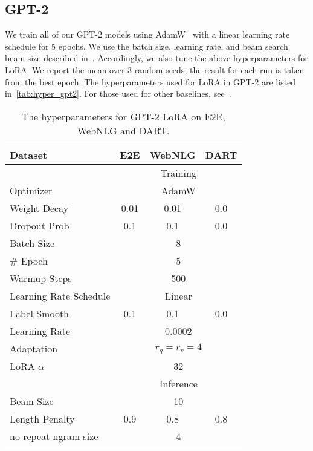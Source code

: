 \subsection{GPT-2}
\label{app:hps_gpt2}
We train all of our GPT-2 models using AdamW~\citep{loshchilov2017decoupled} with a linear learning rate schedule for 5 epochs.
We use the batch size, learning rate, and beam search beam size described in~\cite{li_prefix-tuning_2021}.
Accordingly, we also tune the above hyperparameters for LoRA.
We report the mean over 3 random seeds; the result for each run is taken from the best epoch.
The hyperparameters used for LoRA in GPT-2 are listed in~\autoref{tab:hyper_gpt2}.
For those used for other baselines, see~\cite{li_prefix-tuning_2021}.
\begin{table}[h]
\centering
\begin{tabular}{l|ccc}
\hline
\toprule
Dataset & E2E & WebNLG & DART \\
\midrule
&\multicolumn{3}{c}{Training} \\
\midrule
Optimizer & \multicolumn{3}{c}{AdamW} \\
Weight Decay & 0.01 & 0.01 & 0.0\\
Dropout Prob & 0.1 & 0.1 & 0.0\\
Batch Size & \multicolumn{3}{c}{8} \\
\# Epoch & \multicolumn{3}{c}{5} \\
Warmup Steps & \multicolumn{3}{c}{500} \\
Learning Rate Schedule & \multicolumn{3}{c}{Linear} \\
Label Smooth & 0.1 & 0.1 & 0.0 \\
Learning Rate & \multicolumn{3}{c}{0.0002} \\
Adaptation & \multicolumn{3}{c}{$r_q=r_v=4$} \\
LoRA $\alpha$ & \multicolumn{3}{c}{32} \\
\midrule
&\multicolumn{3}{c}{Inference} \\
\midrule
Beam Size & \multicolumn{3}{c}{10} \\
Length Penalty & 0.9 & 0.8 & 0.8 \\
no repeat ngram size & \multicolumn{3}{c}{4} \\
\bottomrule
\end{tabular}
\caption{The hyperparameters for GPT-2 LoRA on E2E, WebNLG and DART.}
\label{tab:hyper_gpt2}
\end{table}

